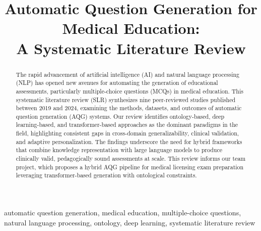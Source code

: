 \documentclass[conference]{IEEEtran}
\begin{document}
\title{Automatic Question Generation for Medical Education:\\
A Systematic Literature Review}

\author{
\and
{}
\and
{}
}

\maketitle

\begin{abstract}
The rapid advancement of artificial intelligence (AI) and natural language processing (NLP) has opened new avenues for automating the generation of educational assessments, particularly multiple-choice questions (MCQs) in medical education. This systematic literature review (SLR) synthesizes nine peer-reviewed studies published between 2019 and 2024, examining the methods, datasets, and outcomes of automatic question generation (AQG) systems. Our review identifies ontology-based, deep learning-based, and transformer-based approaches as the dominant paradigms in the field, highlighting consistent gaps in cross-domain generalizability, clinical validation, and adaptive personalization. The findings underscore the need for hybrid frameworks that combine knowledge representation with large language models to produce clinically valid, pedagogically sound assessments at scale. This review informs our team project, which proposes a hybrid AQG pipeline for medical licensing exam preparation leveraging transformer-based generation with ontological constraints.
\end{abstract}

\begin{IEEEkeywords}
automatic question generation, medical education, multiple-choice questions, natural language processing, ontology, deep learning, systematic literature review
\end{IEEEkeywords}
\end{document}
